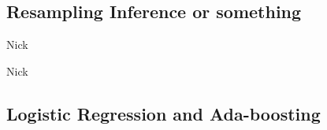 \documentclass[table]{beamer}\usepackage[]{graphicx}\usepackage[]{color}
\begin{document}

\subsection{Resampling Inference or something}


\begin{frame}{Nick}


\end{frame}

\begin{frame}{Nick}

\end{frame}




\subsection{Logistic Regression and Ada-boosting}
\end{document}
